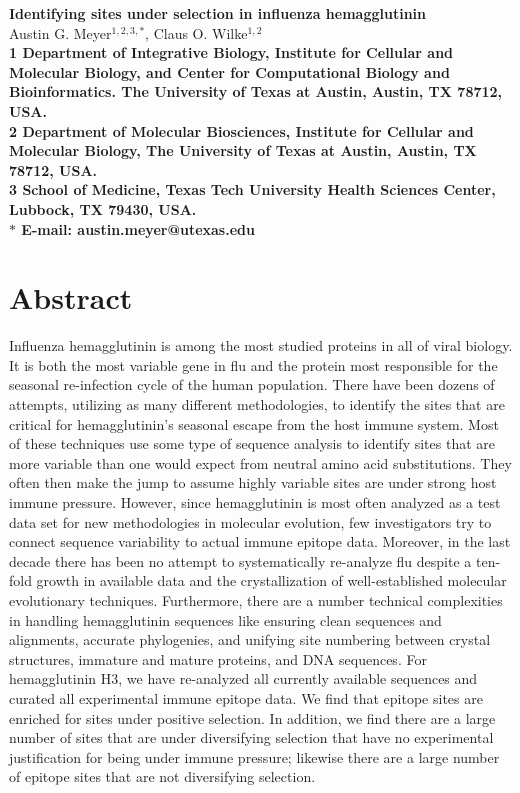 \documentclass[10pt]{article}
\date{}
\begin{document}
\begin{flushleft}
{\Large
\textbf{Identifying sites under selection in influenza hemagglutinin}
}
\\
Austin G. Meyer$^{1,2,3, \ast}$, 
Claus O. Wilke$^{1,2}$
\\
\bf{1} Department of Integrative Biology, Institute for Cellular and Molecular Biology, and Center for Computational Biology and Bioinformatics. The University of Texas at Austin, Austin, TX 78712, USA.
\\
\bf{2} Department of Molecular Biosciences, Institute for Cellular and Molecular Biology, The University of Texas at Austin, Austin, TX 78712, USA.
\\
\bf{3} School of Medicine, Texas Tech University Health Sciences Center, Lubbock, TX 79430, USA.
\\
$\ast$ E-mail: austin.meyer@utexas.edu
\end{flushleft}

\section*{Abstract}
Influenza hemagglutinin is among the most studied proteins in all of viral biology. It is both the most variable gene in flu and the protein most responsible for the seasonal re-infection cycle of the human population. There have been dozens of attempts, utilizing as many different methodologies, to identify the sites that are critical for hemagglutinin's seasonal escape from the host immune system. Most of these techniques use some type of sequence analysis to identify sites that are more variable than one would expect from neutral amino acid substitutions. They often then make the jump to assume highly variable sites are under strong host immune pressure. However, since hemagglutinin is most often analyzed as a test data set for new methodologies in molecular evolution, few investigators try to connect sequence variability to actual immune epitope data. Moreover, in the last decade there has been no attempt to systematically re-analyze flu despite a ten-fold growth in available data and the crystallization of well-established molecular evolutionary techniques. Furthermore, there are a number technical complexities in handling hemagglutinin sequences like ensuring clean sequences and alignments, accurate phylogenies, and unifying site numbering between crystal structures, immature and mature proteins, and DNA sequences. For hemagglutinin H3, we have re-analyzed all currently available sequences and curated all experimental immune epitope data. We find that epitope sites are enriched for sites under positive selection. In addition, we find there are a large number of sites that are under diversifying selection that have no experimental justification for being under immune pressure; likewise there are a large number of epitope sites that are not diversifying selection. 
\end{document}
